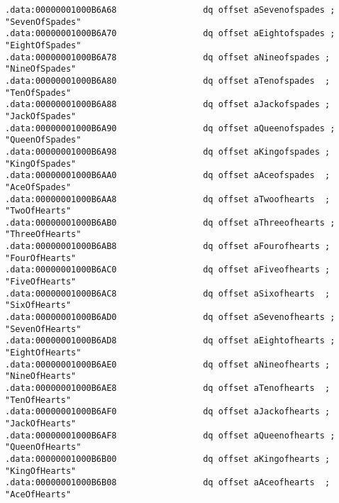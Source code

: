 \begin{lstlisting}
.data:00000001000B6A68                 dq offset aSevenofspades ; "SevenOfSpades"
.data:00000001000B6A70                 dq offset aEightofspades ; "EightOfSpades"
.data:00000001000B6A78                 dq offset aNineofspades ; "NineOfSpades"
.data:00000001000B6A80                 dq offset aTenofspades  ; "TenOfSpades"
.data:00000001000B6A88                 dq offset aJackofspades ; "JackOfSpades"
.data:00000001000B6A90                 dq offset aQueenofspades ; "QueenOfSpades"
.data:00000001000B6A98                 dq offset aKingofspades ; "KingOfSpades"
.data:00000001000B6AA0                 dq offset aAceofspades  ; "AceOfSpades"
.data:00000001000B6AA8                 dq offset aTwoofhearts  ; "TwoOfHearts"
.data:00000001000B6AB0                 dq offset aThreeofhearts ; "ThreeOfHearts"
.data:00000001000B6AB8                 dq offset aFourofhearts ; "FourOfHearts"
.data:00000001000B6AC0                 dq offset aFiveofhearts ; "FiveOfHearts"
.data:00000001000B6AC8                 dq offset aSixofhearts  ; "SixOfHearts"
.data:00000001000B6AD0                 dq offset aSevenofhearts ; "SevenOfHearts"
.data:00000001000B6AD8                 dq offset aEightofhearts ; "EightOfHearts"
.data:00000001000B6AE0                 dq offset aNineofhearts ; "NineOfHearts"
.data:00000001000B6AE8                 dq offset aTenofhearts  ; "TenOfHearts"
.data:00000001000B6AF0                 dq offset aJackofhearts ; "JackOfHearts"
.data:00000001000B6AF8                 dq offset aQueenofhearts ; "QueenOfHearts"
.data:00000001000B6B00                 dq offset aKingofhearts ; "KingOfHearts"
.data:00000001000B6B08                 dq offset aAceofhearts  ; "AceOfHearts"


\end{lstlisting}
